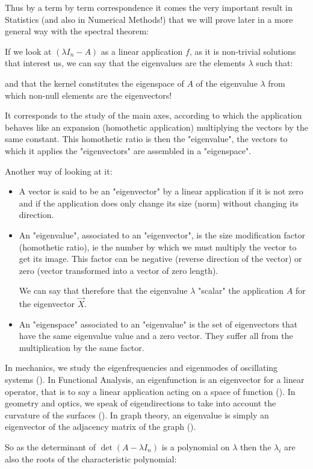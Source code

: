 	Thus by a term by term correspondence it comes the very important result in Statistics (and also in Numerical Methods!) that we will prove later in a more general way with the spectral theorem:
	
	If we look at $(\lambda I_n-A)$ as a linear application $f$, as it is non-trivial solutions that interest us, we can say that the eigenvalues are the elements $\lambda$ such that:
	
	and that the kernel constitutes the eigenspace  of $A$ of the eigenvalue $\lambda$ from which non-null elements are the eigenvectors!
	
	It corresponds to the study of the main axes, according to which the application behaves like an expansion (homothetic application) multiplying the vectors by the same constant. This homothetic ratio is then the "eigenvalue", the vectors to which it applies the "eigenvectors" are assembled in a "eigenspace".
	
	Another way of looking at it:
	\begin{itemize}
		\item A vector is said to be an "eigenvector" by a linear application if it is not zero and if the application does only change its size (norm) without changing its direction.

		\item An "eigenvalue", associated to an "eigenvector", is the size modification factor (homothetic ratio), ie the number by which we must multiply the vector to get its image. This factor can be negative (reverse direction of the vector) or zero (vector transformed into a vector of zero length).
		
		We can say that therefore that the eigenvalue $\lambda$ "scalar" the application $A$ for the eigenvector $\vec{X}$.

		\item An "eigenspace" associated to an "eigenvalue" is the set of eigenvectors that have the same eigenvalue value and a zero vector. They suffer all from the multiplication by the same factor.
	\end{itemize}
	\begin{tcolorbox}[title=Remark,colframe=black,arc=10pt]
	In mechanics, we study the eigenfrequencies and eigenmodes of oscillating systems (). In Functional Analysis, an eigenfunction is an eigenvector for a linear operator, that is to say a linear application acting on a space of function (). In geometry and optics, we speak of eigendirections to take into account the curvature of the surfaces (). In graph theory, an eigenvalue is simply an eigenvector of the adjacency matrix of the graph ().
	\end{tcolorbox}
	So as the determinant of $\det(A-\lambda I_n)$ is a polynomial on $\lambda$ then the $\lambda_i$ are also the roots of the characteristic polynomial:
	
